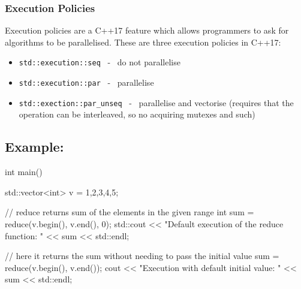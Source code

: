 \documentclass{report}
\begin{document}
\subsubsection*{Execution Policies}
Execution policies are a C++17 feature which allows programmers to ask for algorithms to be parallelised. These are three execution policies in C++17:
\begin{itemize}
    \item \texttt{std::execution::seq} \ - \ do not parallelise
    \item \texttt{std::execution::par} \ - \ parallelise
    \item \texttt{std::exection::par\_unseq} \ - \ parallelise and vectorise (requires that the operation can be interleaved, so no acquiring mutexes and such)
\end{itemize} 
\subsection*{Example:} 
\begin{cppcode}
  
int main() {
    std::vector<int> v = {1,2,3,4,5};

    // reduce returns sum of the elements in the given range
    int sum = reduce(v.begin(), v.end(), 0); 
    std::cout << "Default execution of the reduce function: " <<  sum << std::endl;

    // here it returns the sum without needing to pass the initial value
    sum = reduce(v.begin(), v.end());
    cout << "Execution with default initial value: " << sum << std::endl;
}
\end{cppcode}
\end{document}
